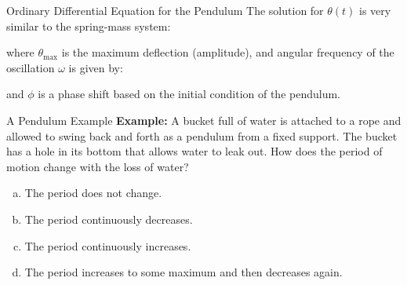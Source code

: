 \documentclass[12pt,compress,aspectratio=169]{beamer}
\newcommand{\eq}[2]{\vspace{#1}{\Large\begin{displaymath}#2\end{displaymath}}}
\begin{document}
\begin{frame}{Ordinary Differential Equation for the Pendulum}
  The solution for $\theta(t)$ is very similar to the spring-mass system:

    \eq{-.2in}{
      \boxed{\theta(t)=\theta_\text{max}\cos(\omega t-\phi)}
    }

    where $\theta_\text{max}$ is the maximum deflection (amplitude), and angular
    frequency of the oscillation $\omega$ is given by:
    
    \eq{-.15in}{
      \boxed{\omega=\sqrt{\frac{g}{L}}}
    }

    and $\phi$ is a phase shift based on the initial condition of the pendulum.
\end{frame}






\begin{frame}{A Pendulum Example}
  \textbf{Example:} A bucket full of water is attached to a rope and allowed
  to swing back and forth as a pendulum from a fixed support. The bucket has a
  hole in its bottom that allows water to leak out. How does the period of
  motion change with the loss of water?
  \begin{enumerate}[(a)]
  \item The period does not change.
  \item The period continuously decreases.
  \item The period continuously increases.
  \item The period increases to some maximum and then decreases again.
  \end{enumerate}
\end{frame}
\end{document}
